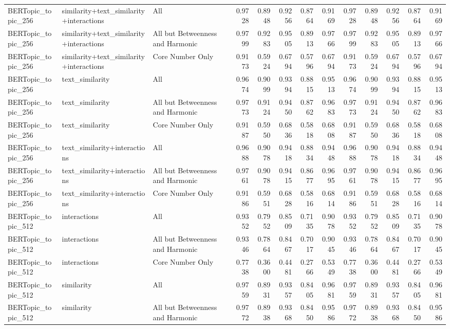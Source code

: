 \begin{tabular}{lllrrrrrrrrrr}
BERTopic_topic_256 & similarity+text_similarity+interactions & All & 0.9728 & 0.8948 & 0.9256 & 0.8764 & 0.9169 & 0.9728 & 0.8948 & 0.9256 & 0.8764 & 0.9169 \\
BERTopic_topic_256 & similarity+text_similarity+interactions & All but Betweenness and Harmonic & 0.9799 & 0.9283 & 0.9505 & 0.8913 & 0.9766 & 0.9799 & 0.9283 & 0.9505 & 0.8913 & 0.9766 \\
BERTopic_topic_256 & similarity+text_similarity+interactions & Core Number Only & 0.9173 & 0.5924 & 0.6794 & 0.5796 & 0.6794 & 0.9173 & 0.5924 & 0.6794 & 0.5796 & 0.6794 \\
BERTopic_topic_256 & text_similarity & All & 0.9674 & 0.9099 & 0.9394 & 0.8815 & 0.9513 & 0.9674 & 0.9099 & 0.9394 & 0.8815 & 0.9513 \\
BERTopic_topic_256 & text_similarity & All but Betweenness and Harmonic & 0.9773 & 0.9124 & 0.9450 & 0.8762 & 0.9683 & 0.9773 & 0.9124 & 0.9450 & 0.8762 & 0.9683 \\
BERTopic_topic_256 & text_similarity & Core Number Only & 0.9187 & 0.5950 & 0.6836 & 0.5818 & 0.6808 & 0.9187 & 0.5950 & 0.6836 & 0.5818 & 0.6808 \\
BERTopic_topic_256 & text_similarity+interactions & All & 0.9688 & 0.9078 & 0.9418 & 0.8834 & 0.9448 & 0.9688 & 0.9078 & 0.9418 & 0.8834 & 0.9448 \\
BERTopic_topic_256 & text_similarity+interactions & All but Betweenness and Harmonic & 0.9761 & 0.9078 & 0.9415 & 0.8677 & 0.9695 & 0.9761 & 0.9078 & 0.9415 & 0.8677 & 0.9695 \\
BERTopic_topic_256 & text_similarity+interactions & Core Number Only & 0.9186 & 0.5951 & 0.6828 & 0.5816 & 0.6814 & 0.9186 & 0.5951 & 0.6828 & 0.5816 & 0.6814 \\
BERTopic_topic_512 & interactions & All & 0.9352 & 0.7952 & 0.8509 & 0.7135 & 0.9078 & 0.9352 & 0.7952 & 0.8509 & 0.7135 & 0.9078 \\
BERTopic_topic_512 & interactions & All but Betweenness and Harmonic & 0.9346 & 0.7864 & 0.8467 & 0.7017 & 0.9045 & 0.9346 & 0.7864 & 0.8467 & 0.7017 & 0.9045 \\
BERTopic_topic_512 & interactions & Core Number Only & 0.7738 & 0.3600 & 0.4481 & 0.2766 & 0.5349 & 0.7738 & 0.3600 & 0.4481 & 0.2766 & 0.5349 \\
BERTopic_topic_512 & similarity & All & 0.9759 & 0.8931 & 0.9357 & 0.8405 & 0.9681 & 0.9759 & 0.8931 & 0.9357 & 0.8405 & 0.9681 \\
BERTopic_topic_512 & similarity & All but Betweenness and Harmonic & 0.9772 & 0.8938 & 0.9368 & 0.8450 & 0.9586 & 0.9772 & 0.8938 & 0.9368 & 0.8450 & 0.9586 \\

\end{tabular}
